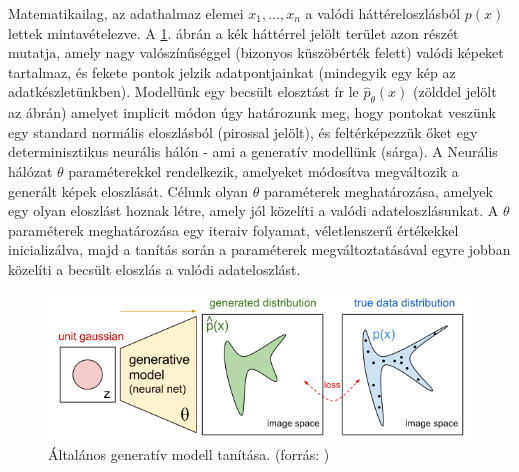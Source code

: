 Matematikailag, az adathalmaz elemei $x_1, \dots, x_n$ a valódi háttéreloszlásból $p(x)$ lettek mintavételezve. A \ref{fig:data_distribution}. ábrán a kék háttérrel jelölt terület azon részét mutatja, amely nagy valószínűséggel (bizonyos küszöbérték felett) valódi képeket tartalmaz, és fekete pontok jelzik adatpontjainkat (mindegyik egy kép az adatkészletünkben). Modellünk egy becsült elosztást ír le $\hat{p}_{\theta}(x)$ (zölddel jelölt az ábrán) amelyet implicit módon úgy határozunk meg, hogy pontokat veszünk egy standard normális eloszlásból (pirossal jelölt), és feltérképezzük őket egy determinisztikus neurális hálón - ami a generatív modellünk (sárga). A Neurális hálózat $\theta$ paraméterekkel rendelkezik, amelyeket módosítva megváltozik a generált képek eloszlását. Célunk olyan $\theta$ paraméterek meghatározása, amelyek egy olyan eloszlást hoznak létre, amely jól közelíti a valódi adateloszlásunkat. A $\theta$ paraméterek meghatározása egy iteraiv folyamat, véletlenszerű értékekkel inicializálva, majd a tanítás során a paraméterek megváltoztatásával egyre jobban közelíti a becsült eloszlás a valódi adateloszlást.

\begin{figure}[ht]
	\centering
	\includegraphics[width=1\columnwidth]{figures/generative_model_math.png}
	\caption{Általános generatív modell tanítása. (forrás: \cite{fig:generative_model_math})}
	\label{fig:data_distribution}
\end{figure}


